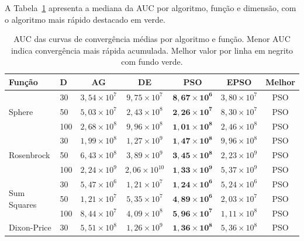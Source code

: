 \documentclass[runningheads]{llncs}
\begin{document}
A Tabela~\ref{tab:auc} apresenta a mediana da AUC por algoritmo,
função e dimensão, com o algoritmo mais rápido destacado em verde.

\begin{table}[H]
\caption{AUC das curvas de convergência médias por algoritmo e função.
Menor AUC indica convergência mais rápida acumulada. Melhor valor por
linha em negrito com fundo verde.}
\label{tab:auc}
\centering
\scriptsize
\setlength{\tabcolsep}{4pt}
\begin{tabular}{llccccc}
\toprule
\textbf{Função} & \textbf{D} &
\textbf{AG} & \textbf{DE} & \textbf{PSO} & \textbf{EPSO} & \textbf{Melhor} \\
\midrule
\multirow{3}{*}{Sphere}
  & 30  & $3{,}54{\times}10^{7}$ & $9{,}75{\times}10^{7}$ & \cellcolor{green!20}$\mathbf{8{,}67{\times}10^{6}}$ & $3{,}80{\times}10^{7}$ & PSO \\
  & 50  & $5{,}03{\times}10^{7}$ & $2{,}43{\times}10^{8}$ & \cellcolor{green!20}$\mathbf{2{,}26{\times}10^{7}}$ & $8{,}30{\times}10^{7}$ & PSO \\
  & 100 & $2{,}68{\times}10^{8}$ & $9{,}96{\times}10^{8}$ & \cellcolor{green!20}$\mathbf{1{,}01{\times}10^{8}}$ & $2{,}46{\times}10^{8}$ & PSO \\
\midrule
\multirow{3}{*}{Rosenbrock}
  & 30  & $1{,}99{\times}10^{8}$ & $1{,}27{\times}10^{9}$ & \cellcolor{green!20}$\mathbf{1{,}47{\times}10^{8}}$ & $9{,}96{\times}10^{8}$ & PSO \\
  & 50  & $6{,}43{\times}10^{8}$ & $3{,}89{\times}10^{9}$ & \cellcolor{green!20}$\mathbf{3{,}45{\times}10^{8}}$ & $2{,}23{\times}10^{9}$ & PSO \\
  & 100 & $2{,}24{\times}10^{9}$ & $2{,}06{\times}10^{10}$ & \cellcolor{green!20}$\mathbf{1{,}33{\times}10^{9}}$ & $5{,}37{\times}10^{9}$ & PSO \\
\midrule
\multirow{3}{*}{Sum Squares}
  & 30  & $5{,}47{\times}10^{6}$ & $1{,}21{\times}10^{7}$ & \cellcolor{green!20}$\mathbf{1{,}24{\times}10^{6}}$ & $5{,}24{\times}10^{6}$ & PSO \\
  & 50  & $1{,}21{\times}10^{7}$ & $5{,}35{\times}10^{7}$ & \cellcolor{green!20}$\mathbf{4{,}89{\times}10^{6}}$ & $2{,}03{\times}10^{7}$ & PSO \\
  & 100 & $8{,}44{\times}10^{7}$ & $4{,}09{\times}10^{8}$ & \cellcolor{green!20}$\mathbf{5{,}96{\times}10^{7}}$ & $1{,}11{\times}10^{8}$ & PSO \\
\midrule
\multirow{3}{*}{Dixon-Price}
  & 30  & $5{,}51{\times}10^{8}$ & $1{,}26{\times}10^{9}$ & \cellcolor{green!20}$\mathbf{1{,}36{\times}10^{8}}$ & $5{,}36{\times}10^{8}$ & PSO \\

\end{tabular}
\end{table}
\end{document}
